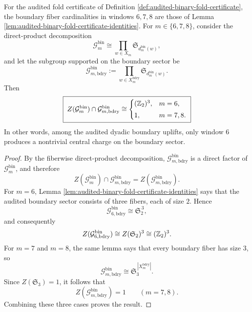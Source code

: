\begin{theorem}\label{thm:window6-boundary-central-charge-unique-among-audited-lifts}
For the audited fold certificate of Definition \ref{def:audited-binary-fold-certificate}, the boundary fiber cardinalities in windows \(6,7,8\) are those of Lemma \ref{lem:audited-binary-fold-certificate-identities}.
For \(m\in\{6,7,8\}\), consider the direct-product decomposition
\[
\mathcal G_m^{\mathrm{bin}}
\cong
\prod_{w\in X_m}\mathfrak S_{d_m^{\mathrm{bin}}(w)},
\]
and let the subgroup supported on the boundary sector be
\[
\mathcal G_{m,\mathrm{bdry}}^{\mathrm{bin}}
:=
\prod_{w\in X_m^{\mathrm{bdry}}}\mathfrak S_{d_m^{\mathrm{bin}}(w)}.
\]
Then
\[
\boxed{\;
Z(\mathcal G_m^{\mathrm{bin}})
\cap
\mathcal G_{m,\mathrm{bdry}}^{\mathrm{bin}}
\cong
\begin{cases}
(\mathbb{Z}_2)^3, & m=6,\\[1mm]
1, & m=7,8.
\end{cases}
\;}
\]
In other words, among the audited dyadic boundary uplifts, only window \(6\) produces a nontrivial central charge on the boundary sector.
\end{theorem}
\begin{proof}
By the fiberwise direct-product decomposition, \(\mathcal G_{m,\mathrm{bdry}}^{\mathrm{bin}}\) is a direct factor of \(\mathcal G_m^{\mathrm{bin}}\), and therefore
\[
Z(\mathcal G_m^{\mathrm{bin}})
\cap
\mathcal G_{m,\mathrm{bdry}}^{\mathrm{bin}}
=
Z(\mathcal G_{m,\mathrm{bdry}}^{\mathrm{bin}}).
\]
For \(m=6\), Lemma \ref{lem:audited-binary-fold-certificate-identities} says that the audited boundary sector consists of three fibers, each of size \(2\).
Hence
\[
\mathcal G_{6,\mathrm{bdry}}^{\mathrm{bin}}\cong \mathfrak S_2^{\,3},
\]
and consequently
\[
Z(\mathcal G_{6,\mathrm{bdry}}^{\mathrm{bin}})
\cong
Z(\mathfrak S_2)^3
\cong
(\mathbb{Z}_2)^3.
\]
For \(m=7\) and \(m=8\), the same lemma says that every boundary fiber has size \(3\), so
\[
\mathcal G_{m,\mathrm{bdry}}^{\mathrm{bin}}
\cong
\mathfrak S_3^{\,|X_m^{\mathrm{bdry}}|}.
\]
Since \(Z(\mathfrak S_3)=1\), it follows that
\[
Z(\mathcal G_{m,\mathrm{bdry}}^{\mathrm{bin}})=1
\qquad(m=7,8).
\]
Combining these three cases proves the result. \qedhere
\end{proof}
